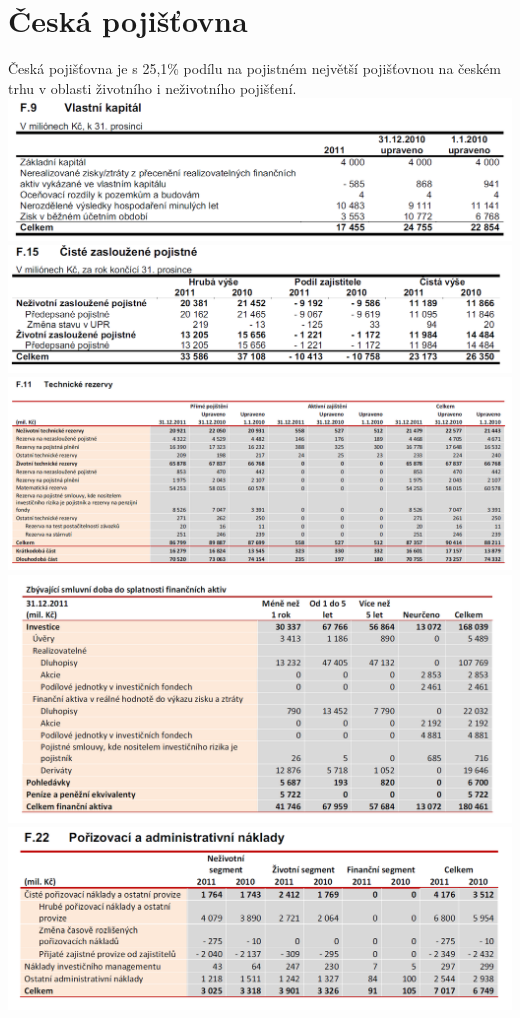 \documentclass[12pt,oneside]{fithesis}
\begin{document}
\section{Česká pojišťovna}
Česká pojišťovna je s 25,1\% podílu na pojistném největší pojišťovnou na českém trhu v oblasti životního i neživotního pojišťení.\\
\includegraphics[width=1.0\textwidth]{cp-vlk.png}
\includegraphics[width=1.0\textwidth]{cp-poj.png}
\includegraphics[width=1.0\textwidth]{cp-tr.png}
\includegraphics[width=1.0\textwidth]{cp-likv.png}
\includegraphics[width=1.0\textwidth]{cp-nakl.png}
\end{document}

